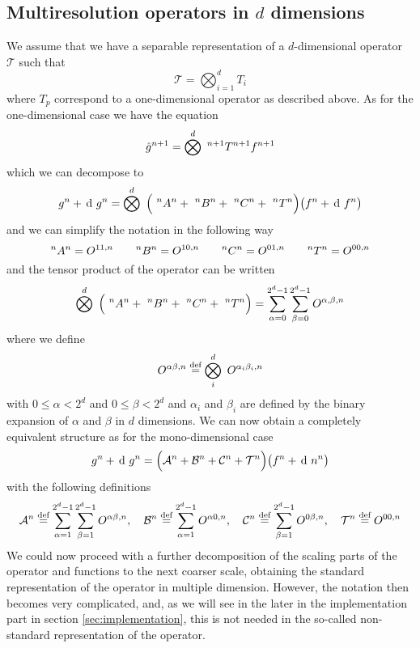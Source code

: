 \subsection{Multiresolution operators in $d$ dimensions}
We assume that we have a separable representation of a $d$-dimensional
operator $\mathcal{T}$ such that
\begin{equation}
    \mathcal{T} = \bigotimes_{i=1}^d T_i
\end{equation}
where $T_p$ correspond to a one-dimensional operator as described above.
As for the one-dimensional case we have the equation
\begin{equation}
    \scalingrep{\hat{g}}{n+1} = \bigotimes^d\ \T{n+1}{n+1} \scalingrep{f}{n+1}
\end{equation}
which we can decompose to
\begin{equation}
    \scalingrep{g}{n} + \waveletrep{g}{n} = 
	\bigotimes^d\ \Big(\ \A{n}{n} +\ \B{n}{n} +\ \C{n}{n}+\ \T{n}{n}\Big) 
	\big(\scalingrep{f}{n} + \waveletrep{f}{n}\big)
\end{equation}
and we can simplify the notation in the following way
\begin{equation}
    ^{n}A^{n} = O^{11,n} \qquad
    ^{n}B^{n} = O^{10,n} \qquad
    ^{n}C^{n} = O^{01,n} \qquad
    ^{n}T^{n} = O^{00,n}
\end{equation}
and the tensor product of the operator can be written
\begin{equation}
    \bigotimes^d\ \Big(\ \A{n}{n}+\ \B{n}{n} +\ \C{n}{n}+\ \T{n}{n}\Big) =
	\sum_{\alpha=0}^{2^d-1} \sum_{\beta=0}^{2^d-1} O^{\alpha,\beta,n}
\end{equation}
where we define
\begin{equation}
    O^{\alpha\beta,n} \mydef \bigotimes_{i}^d\ O^{\alpha_i\beta_i,n}
\end{equation}
with $0 \leq \alpha < 2^d$ and $0 \leq \beta < 2^d$ and $\alpha_i$ and $\beta_i$
are defined by the binary expansion of $\alpha$ and $\beta$ in $d$ dimensions.
We can now obtain a completely equivalent structure as for the mono-dimensional
case
\begin{equation}
    \scalingrep{g}{n} + \waveletrep{g}{n} = 
	\Big(\mathcal{A}^n + \mathcal{B}^n + \mathcal{C}^n + \mathcal{T}^n\Big)
	\big(\scalingrep{f}{n} + \waveletrep{n}{n}\big)
\end{equation} 
with the following definitions
\begin{equation}
    \mathcal{A}^{n} \stackrel{\text{def}}{\hbox{=}} 
    \sum_{\alpha=1}^{2^d-1} \sum_{\beta=1}^{2^d-1} O^{\alpha\beta,n}, \quad
    \mathcal{B}^{n} \stackrel{\text{def}}{\hbox{=}} 
    \sum_{\alpha=1}^{2^d-1} O^{\alpha 0,n}, \quad
    \mathcal{C}^{n} \stackrel{\text{def}}{\hbox{=}} 
    \sum_{\beta=1}^{2^d-1} O^{0 \beta,n}, \quad 
    \mathcal{T}^{n} \stackrel{\text{def}}{\hbox{=}} O^{00,n}
\end{equation}
We could now proceed with a further decomposition of the scaling parts of the
operator and functions to the next coarser scale, obtaining the standard
representation of the operator in multiple dimension. However, the notation
then becomes very complicated, and, as we will see in the later in the 
implementation part in section \ref{sec:implementation}, this is not needed
in the so-called non-standard representation of the operator.

